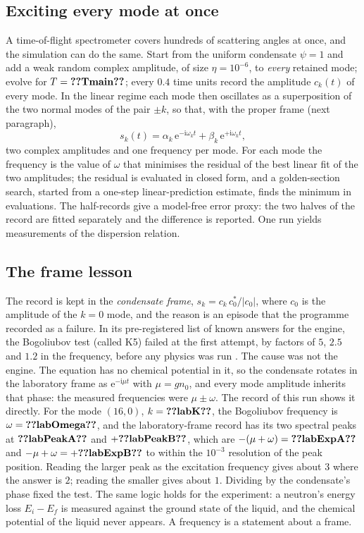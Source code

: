 \subsection{Exciting every mode at once}
A time-of-flight spectrometer covers hundreds of scattering angles at once, and the simulation can do the same.
Start from the uniform condensate $\psi=1$ and add a weak random complex amplitude, of size $\eta=10^{-6}$, to \emph{every} retained mode; evolve for $T=\cfiveV{Tmain}$; every $0.4$ time units record the amplitude $c_k(t)$ of every mode.
In the linear regime each mode then oscillates as a superposition of the two normal modes of the pair $\pm k$, so that, with the proper frame (next paragraph),
\begin{equation}\label{ch05:eq-twofreq}
 s_k(t)=\alpha_k\,\mathrm e^{-\mathrm i\omega_kt}+\beta_k\,\mathrm e^{+\mathrm i\omega_kt},
\end{equation}
two complex amplitudes and one frequency per mode.
For each mode the frequency is the value of $\omega$ that minimises the residual of the best linear fit of the two amplitudes; the residual is evaluated in closed form, and a golden-section search, started from a one-step linear-prediction estimate, finds the minimum in  evaluations.
The half-records give a model-free error proxy: the two halves of the record are fitted separately and the difference is reported.
One run yields  measurements of the dispersion relation.

\subsection{The frame lesson}
The record is kept in the \emph{condensate frame}, $s_k=c_k\,c_0^\ast/|c_0|$, where $c_0$ is the amplitude of the $k=0$ mode, and the reason is an episode that the programme recorded as a failure.
In its pre-registered list of known answers for the engine, the Bogoliubov test (called K5) failed at the first attempt, by factors of $5$, $2.5$ and $1.2$ in the frequency, before any physics was run \cite{Callens2026prereg}.
The cause was not the engine.
The equation has no chemical potential in it, so the condensate rotates in the laboratory frame as $\mathrm e^{-\mathrm i\mu t}$ with $\mu=gn_0$, and every mode amplitude inherits that phase: the measured frequencies were $\mu\pm\omega$.
The record of this run shows it directly.
For the mode $(16,0)$, $k=\cfiveV{labK}$, the Bogoliubov frequency is $\omega=\cfiveV{labOmega}$, and the laboratory-frame record has its two spectral peaks at $\cfiveV{labPeakA}$ and $+\cfiveV{labPeakB}$, which are $-(\mu+\omega)=\cfiveV{labExpA}$ and $-\mu+\omega=+\cfiveV{labExpB}$ to within the $10^{-3}$ resolution of the peak position.
Reading the larger peak as the excitation frequency gives about $3$ where the answer is $2$; reading the smaller gives about $1$.
Dividing by the condensate's phase fixed the test.
The same logic holds for the experiment: a neutron's energy loss $E_i-E_f$ is measured against the ground state of the liquid, and the chemical potential of the liquid never appears.
A frequency is a statement about a frame.

